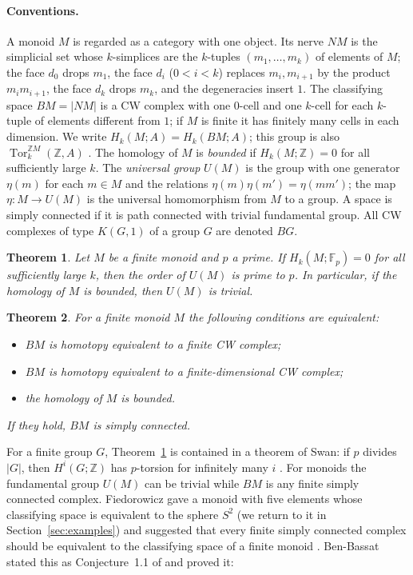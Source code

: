 \documentclass[11pt,a4paper]{article}
\newtheorem{theorem}{Theorem}[section]
\theoremstyle{definition}
\newcommand{\Z}{\mathbb{Z}}
\newcommand{\F}{\mathbb{F}}
\newcommand{\Tor}{\operatorname{Tor}}
\begin{document}
\paragraph{Conventions.} A monoid $M$ is regarded as a category with one
object. Its nerve $NM$ is the simplicial set whose $k$-simplices are the
$k$-tuples $(m_1,\dots,m_k)$ of elements of $M$; the face $d_0$ drops $m_1$,
the face $d_i$ ($0<i<k$) replaces $m_i,m_{i+1}$ by the product $m_im_{i+1}$,
the face $d_k$ drops $m_k$, and the degeneracies insert $1$. The classifying
space $BM=|NM|$ is a CW complex with one $0$-cell and one $k$-cell for each
$k$-tuple of elements different from $1$; if $M$ is finite it has finitely many
cells in each dimension. We write $H_k(M;A)=H_k(BM;A)$; this group is also
$\Tor_k^{\Z M}(\Z,A)$ \cite[Proposition~2.2, Corollary~2.3]{Sw}. The homology of
$M$ is \emph{bounded} if $H_k(M;\Z)=0$ for all sufficiently large $k$. The
\emph{universal group} $U(M)$ is the group with one generator $\eta(m)$ for
each $m\in M$ and the relations $\eta(m)\eta(m')=\eta(mm')$; the map
$\eta\colon M\to U(M)$ is the universal homomorphism from $M$ to a group. A
space is simply connected if it is path connected with trivial fundamental
group. All CW complexes of type $K(G,1)$ of a group $G$ are denoted $BG$.

\begin{theorem}\label{thm:main}
Let $M$ be a finite monoid and $p$ a prime. If $H_k(M;\F_p)=0$ for all
sufficiently large $k$, then the order of $U(M)$ is prime to $p$. In
particular, if the homology of $M$ is bounded, then $U(M)$ is trivial.
\end{theorem}

\begin{theorem}\label{thm:equiv}
For a finite monoid $M$ the following conditions are equivalent:
\begin{itemize}
\item[\textup{(i)}] $BM$ is homotopy equivalent to a finite CW complex;
\item[\textup{(ii)}] $BM$ is homotopy equivalent to a finite-dimensional CW
complex;
\item[\textup{(iii)}] the homology of $M$ is bounded.
\end{itemize}
If they hold, $BM$ is simply connected.
\end{theorem}

For a finite group $G$, Theorem~\ref{thm:main} is contained in a theorem of
Swan: if $p$ divides $|G|$, then $H^i(G;\Z)$ has $p$-torsion for infinitely
many $i$ \cite[Corollary~1, and Corollary~2 for homology]{Swan}. For monoids
the fundamental group $U(M)$ can be trivial while $BM$ is any finite simply
connected complex. Fiedorowicz gave a monoid with five elements whose
classifying space is equivalent to the sphere $S^2$ (we return to it in
Section~\ref{sec:examples}) and suggested that every finite simply connected
complex should be equivalent to the classifying space of a finite monoid
\cite[p.~323]{Fie}. Ben-Bassat stated this as Conjecture~1.1 of \cite{BB}
and proved it:
\end{document}
